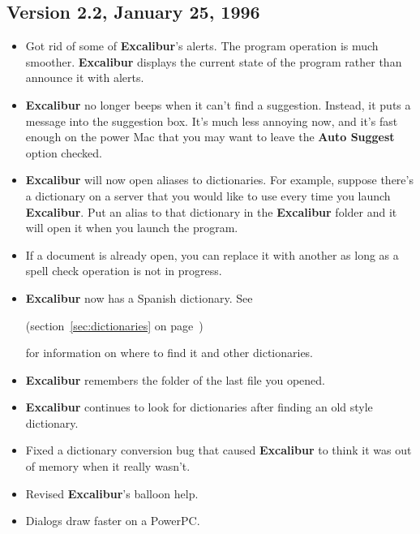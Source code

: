 \documentclass[11pt,titlepage]{article}
\newcommand{\ex}{\textbf{Excalibur}}
\begin{document}
\subsection{Version 2.2, January 25, 1996}

\begin{itemize}

\item Got rid of some of \ex's alerts.  The program operation is much
  smoother.  \ex{} displays the current state of the program rather
  than announce it with alerts.

\item \ex{} no longer beeps when it can't find a suggestion.  Instead,
  it puts a message into the suggestion box.  It's much less annoying
  now, and it's fast enough on the power Mac that you may want to
  leave the \textbf{Auto Suggest} option checked.

\item \ex{} will now open aliases to dictionaries.  For example,
  suppose there's a dictionary on a server that you would like to use
  every time you launch \ex.  Put an alias to that dictionary in the
  \ex{} folder and it will open it when you launch the program.

\item If a document is already open, you can replace it with another
  as long as a spell check operation is not in progress.

\item \ex{} now has a Spanish dictionary.  See 
    \begin{latexonly}
      (section~\ref{sec:dictionaries} on
      page~\pageref{sec:dictionaries})
    \end{latexonly}
    for information on where to find it and other dictionaries.

\item \ex{} remembers the folder of the last file you opened.

\item \ex{} continues to look for dictionaries after finding an old
  style dictionary.

\item Fixed a dictionary conversion bug that caused \ex{} to think it
  was out of memory when it really wasn't.

\item Revised \ex's balloon help.

\item Dialogs draw faster on a PowerPC.


\end{itemize}
\end{document}
